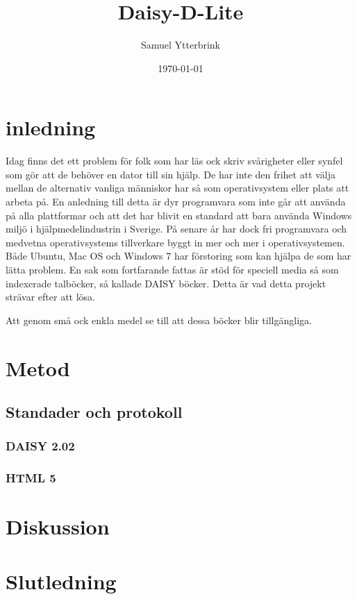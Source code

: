 \documentclass{report}
\begin{document}
\title{Daisy-D-Lite}
\author{Samuel Ytterbrink}
\date{\today}
\maketitle

\begin{abstract}

\end{abstract}

\section{inledning}
Idag finns det ett problem för folk som har läs ock skriv svårigheter eller synfel som gör att de  behöver en dator till sin hjälp. 
De har inte den frihet att välja mellan de alternativ vanliga människor har så som operativsystem eller plats att arbeta på.
En anledning till detta är dyr programvara som inte går att använda på alla plattformar och att det har blivit en standard att bara använda Windows miljö i hjälpmedelindustrin i Sverige.
På senare år har dock fri programvara och medvetna operativsystems tillverkare byggt in mer och mer i operativsystemen.
Både Ubuntu, Mac OS och Windows 7 har förstoring som kan hjälpa de som har lätta problem.
En sak som fortfarande fattas är stöd för speciell media så som indexerade talböcker, så kallade DAISY böcker.
Detta är vad detta projekt strävar efter att lösa.

Att genom små ock enkla medel se till att dessa böcker blir tillgängliga.

\section{Metod}

\subsection{Standader och protokoll}

\subsubsection{DAISY 2.02}

\subsubsection{HTML 5}

\section{Diskussion}

\subsection{}

\section{Slutledning}
\end{document}
